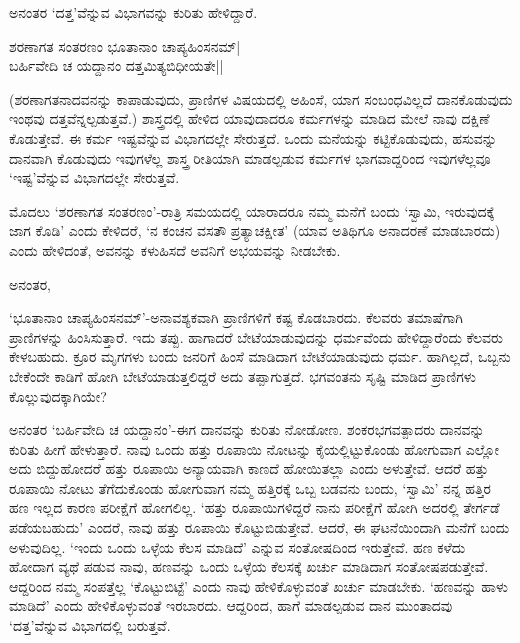 ಅನಂತರ `ದತ್ತ'ವೆನ್ನುವ ವಿಭಾಗವನ್ನು ಕುರಿತು ಹೇಳಿದ್ದಾರೆ.

\begin{shloka}
ಶರಣಾಗತ ಸಂತರಣಂ ಭೂತಾನಾಂ ಚಾಪ್ಯಹಿಂಸನಮ್|\\
ಬರ್ಹಿವೇದಿ ಚ ಯದ್ದಾನಂ ದತ್ತಮಿತ್ಯಬಿಧೀಯತೇ||
\end{shloka}

(ಶರಣಾಗತನಾದವನನ್ನು ಕಾಪಾಡುವುದು, ಪ್ರಾಣಿಗಳ ವಿಷಯದಲ್ಲಿ ಅಹಿಂಸೆ, ಯಾಗ ಸಂಬಂಧವಿಲ್ಲದೆ ದಾನಕೊಡುವುದು ಇಂಥವು ದತ್ತವೆನ್ನಲ್ಪಡುತ್ತವೆ.) ಶಾಸ್ತ್ರದಲ್ಲಿ ಹೇಳಿದ ಯಾವುದಾದರೂ ಕರ್ಮಗಳನ್ನು ಮಾಡಿದ ಮೇಲೆ ನಾವು ದಕ್ಷಿಣೆ ಕೊಡುತ್ತೇವೆ. ಈ ಕರ್ಮ ಇಷ್ಟವೆನ್ನುವ ವಿಭಾಗದಲ್ಲೇ ಸೇರುತ್ತದೆ. ಒಂದು ಮನೆಯನ್ನು ಕಟ್ಟಿಕೊಡುವುದು, ಹಸುವನ್ನು ದಾನವಾಗಿ ಕೊಡುವುದು ಇವುಗಳೆಲ್ಲ ಶಾಸ್ತ್ರ ರೀತಿಯಾಗಿ ಮಾಡಲ್ಪಡುವ ಕರ್ಮಗಳ ಭಾಗವಾದ್ದರಿಂದ ಇವುಗಳೆಲ್ಲವೂ `ಇಷ್ಟ'ವೆನ್ನುವ ವಿಭಾಗದಲ್ಲೇ ಸೇರುತ್ತವೆ.

ಮೊದಲು `ಶರಣಾಗತ ಸಂತರಣಂ'-ರಾತ್ರಿ ಸಮಯದಲ್ಲಿ ಯಾರಾದರೂ ನಮ್ಮ ಮನೆಗೆ ಬಂದು `ಸ್ವಾಮಿ, ಇರುವುದಕ್ಕೆ ಜಾಗ ಕೊಡಿ' ಎಂದು ಕೇಳಿದರೆ, `ನ ಕಂಚನ ವಸತೌ ಪ್ರತ್ಯಾಚಕ್ಷೀತ' (ಯಾವ ಅತಿಥಿಗೂ ಅನಾದರಣೆ ಮಾಡಬಾರದು) ಎಂದು ಹೇಳಿದಂತೆ, ಅವನನ್ನು ಕಳುಹಿಸದೆ ಅವನಿಗೆ ಅಭಯವನ್ನು ನೀಡಬೇಕು. 

ಅನಂತರ,

`ಭೂತಾನಾಂ ಚಾಪ್ಯಹಿಂಸನಮ್'-ಅನಾವಶ್ಯಕವಾಗಿ ಪ್ರಾಣಿಗಳಿಗೆ ಕಷ್ಟ ಕೊಡಬಾರದು. ಕೆಲವರು ತಮಾಷೆಗಾಗಿ ಪ್ರಾಣಿಗಳನ್ನು ಹಿಂಸಿಸುತ್ತಾರೆ. ಇದು ತಪ್ಪು. ಹಾಗಾದರೆ ಬೇಟೆಯಾಡುವುದನ್ನು ಧರ್ಮವೆಂದು ಹೇಳಿದ್ದಾರೆಂದು ಕೆಲವರು ಕೇಳಬಹುದು. ಕ್ರೂರ ಮೃಗಗಳು ಬಂದು ಜನರಿಗೆ ಹಿಂಸೆ ಮಾಡಿದಾಗ ಬೇಟೆಯಾಡುವುದು ಧರ್ಮ. ಹಾಗಿಲ್ಲದೆ, ಒಬ್ಬನು ಬೇಕೆಂದೇ ಕಾಡಿಗೆ ಹೋಗಿ ಬೇಟೆಯಾಡುತ್ತಲಿದ್ದರೆ ಅದು ತಪ್ಪಾಗುತ್ತದೆ. ಭಗವಂತನು ಸೃಷ್ಟಿ ಮಾಡಿದ ಪ್ರಾಣಿಗಳು ಕೊಲ್ಲುವುದಕ್ಕಾಗಿಯೇ?

ಅನಂತರ `ಬರ್ಹಿವೇದಿ ಚ ಯದ್ದಾನಂ'-ಈಗ ದಾನವನ್ನು ಕುರಿತು ನೋಡೋಣ. ಶಂಕರಭಗವತ್ಪಾದರು ದಾನವನ್ನು ಕುರಿತು ಹೀಗೆ ಹೇಳುತ್ತಾರೆ. ನಾವು ಒಂದು ಹತ್ತು ರೂಪಾಯಿ ನೋಟನ್ನು ಕೈಯಲ್ಲಿಟ್ಟುಕೊಂಡು ಹೋಗುವಾಗ ಎಲ್ಲೋ ಅದು ಬಿದ್ದುಹೋದರೆ ಹತ್ತು ರೂಪಾಯಿ ಅನ್ಯಾಯವಾಗಿ ಕಾಣದೆ ಹೋಯಿತಲ್ಲಾ ಎಂದು ಅಳುತ್ತೇವೆ. ಆದರೆ ಹತ್ತು ರೂಪಾಯಿ ನೋಟು ತೆಗೆದುಕೊಂಡು ಹೋಗುವಾಗ ನಮ್ಮ ಹತ್ತಿರಕ್ಕೆ ಒಬ್ಬ ಬಡವನು ಬಂದು, `ಸ್ವಾಮಿ' ನನ್ನ ಹತ್ತಿರ ಹಣ ಇಲ್ಲದ ಕಾರಣ ಪರೀಕ್ಷೆಗೆ ಹೋಗಲಿಲ್ಲ. `ಹತ್ತು ರೂಪಾಯಿಗಳಿದ್ದರೆ ನಾನು ಪರೀಕ್ಷೆಗೆ ಹೋಗಿ ಅದರಲ್ಲಿ ತೇರ್ಗಡೆ ಪಡೆಯಬಹುದು' ಎಂದರೆ, ನಾವು ಹತ್ತು ರೂಪಾಯಿ ಕೊಟ್ಟುಬಿಡುತ್ತೇವೆ. ಆದರೆ, ಈ ಘಟನೆಯಿಂದಾಗಿ ಮನೆಗೆ ಬಂದು ಅಳುವುದಿಲ್ಲ. `ಇಂದು ಒಂದು ಒಳ್ಳೆಯ ಕೆಲಸ ಮಾಡಿದೆ' ಎನ್ನುವ ಸಂತೋಷದಿಂದ ಇರುತ್ತೇವೆ. ಹಣ ಕಳೆದು ಹೋದಾಗ ವ್ಯಥೆ ಪಡುವ ನಾವು, ಹಣವನ್ನು ಒಂದು ಒಳ್ಳೆಯ ಕೆಲಸಕ್ಕೆ ಖರ್ಚು ಮಾಡಿದಾಗ ಸಂತೋಷಪಡುತ್ತೇವೆ. ಆದ್ದರಿಂದ ನಮ್ಮ ಸಂಪತ್ತೆಲ್ಲ `ಕೊಟ್ಟುಬಿಟ್ಟೆ' ಎಂದು ನಾವು ಹೇಳಿಕೊಳ್ಳುವಂತೆ ಖರ್ಚು ಮಾಡಬೇಕು. `ಹಣವನ್ನು ಹಾಳು ಮಾಡಿದೆ' ಎಂದು ಹೇಳಿಕೊಳ್ಳುವಂತೆ ಇರಬಾರದು. ಆದ್ದರಿಂದ, ಹಾಗೆ ಮಾಡಲ್ಪಡುವ ದಾನ ಮುಂತಾದವು `ದತ್ತ'ವೆನ್ನುವ ವಿಭಾಗದಲ್ಲಿ ಬರುತ್ತವೆ.

